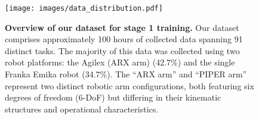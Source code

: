 \begin{table}[t]
    \centering
    \vspace{0.3cm}

    \caption{\textbf{Detailed hyperparameters for training Dex-VLA.}}
    \label{tab:hyperparams}
    
\end{table}

\begin{figure}[t]
    \centering
    \texttt{[image: images/data\_distribution.pdf]}
    \caption{\textbf{Overview of our dataset for stage 1 training.} Our dataset comprises approximately 100 hours of collected data spanning 91 distinct tasks. The majority of this data was collected using two robot platforms: the Agilex (ARX arm) (42.7\%) and the single Franka Emika robot (34.7\%). The ``ARX arm'' and ``PIPER arm'' represent two distinct robotic arm configurations, both featuring six degrees of freedom (6-DoF) but differing in their kinematic structures and operational characteristics.}\label{fig:data_allocation}
\end{figure}
